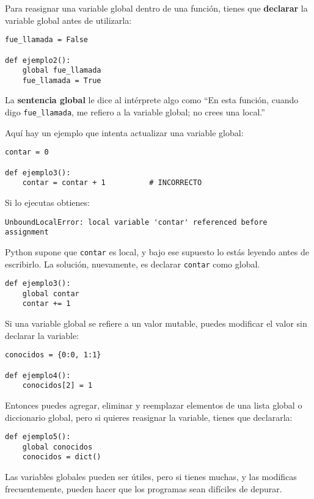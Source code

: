 \documentclass[10pt]{book}
\begin{document}
Para reasignar una variable global dentro de una función, tienes que
{\bf declarar} la variable global antes de utilizarla:

\begin{verbatim}
fue_llamada = False

def ejemplo2():
    global fue_llamada
    fue_llamada = True
\end{verbatim}
%
La {\bf sentencia global} le dice al intérprete
algo como ``En esta función, cuando digo \verb"fue_llamada",
me refiero a la variable global; no crees una local.''

Aquí hay un ejemplo que intenta actualizar una variable global:

\begin{verbatim}
contar = 0

def ejemplo3():
    contar = contar + 1          # INCORRECTO
\end{verbatim}
%
Si lo ejecutas obtienes:

\begin{verbatim}
UnboundLocalError: local variable 'contar' referenced before assignment
\end{verbatim}
%
Python supone que {\tt contar} es local, y bajo ese supuesto
lo estás leyendo antes de escribirlo.  La solución, nuevamente,
es declarar {\tt contar} como global.

\begin{verbatim}
def ejemplo3():
    global contar
    contar += 1
\end{verbatim}
%
Si una variable global se refiere a un valor mutable, puedes modificar
el valor sin declarar la variable:

\begin{verbatim}
conocidos = {0:0, 1:1}

def ejemplo4():
    conocidos[2] = 1
\end{verbatim}
%
Entonces puedes agregar, eliminar y reemplazar elementos de una lista global o diccionario
global, pero si quieres reasignar la variable,
tienes que declararla:

\begin{verbatim}
def ejemplo5():
    global conocidos
    conocidos = dict()
\end{verbatim}
%
Las variables globales pueden ser útiles, pero si tienes muchas,
y las modificas frecuentemente, pueden hacer que los programas sean
difíciles de depurar.
\end{document}
